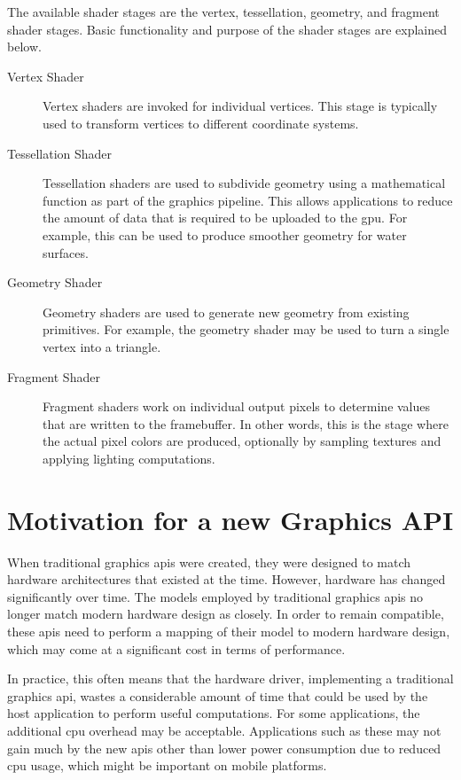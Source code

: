     The available shader stages are the vertex, tessellation, geometry, and fragment shader stages.
    Basic functionality and purpose of the shader stages are explained below.

    \begin{description}
      \item[Vertex Shader]
        Vertex shaders are invoked for individual vertices.
        This stage is typically used to transform vertices to different coordinate systems.

      \item[Tessellation Shader]
        Tessellation shaders are used to subdivide geometry using a mathematical function as part of the graphics pipeline.
        This allows applications to reduce the amount of data that is required to be uploaded to the \gls{gpu}.
        For example, this can be used to produce smoother geometry for water surfaces.

      \item[Geometry Shader]
        Geometry shaders are used to generate new geometry from existing primitives.
        For example, the geometry shader may be used to turn a single vertex into a triangle.

      \item[Fragment Shader]
        Fragment shaders work on individual output pixels to determine values that are written to the framebuffer.
        In other words, this is the stage where the actual pixel colors are produced, optionally by sampling textures and applying lighting computations.
    \end{description}


  \section{Motivation for a new Graphics API}
    When traditional graphics \glspl{api} were created, they were designed to match hardware architectures that existed at the time.
    However, hardware has changed significantly over time.
    The models employed by traditional graphics \glspl{api} no longer match modern hardware design as closely.
    In order to remain compatible, these \glspl{api} need to perform a mapping of their model to modern hardware design, which may come at a significant cost in terms of performance.

    In practice, this often means that the hardware driver, implementing a traditional graphics \gls{api}, wastes a considerable amount of time that could be used by the host application to perform useful computations.
    For some applications, the additional \gls{cpu} overhead may be acceptable.
    Applications such as these may not gain much by the new \glspl{api} other than lower power consumption due to reduced \gls{cpu} usage, which might be important on mobile platforms.

